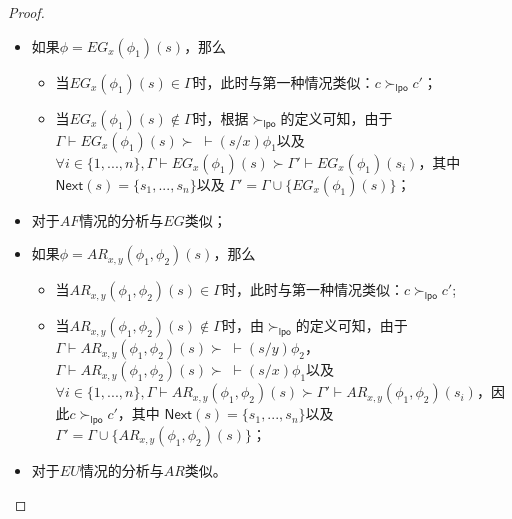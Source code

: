 \begin{proof}
\begin{itemize}
		\item 如果$\phi = EG_x(\phi_1)(s)$，那么
		\begin{itemize}
			\item 当$EG_x(\phi_1)(s)\in \Gamma$时，此时与第一种情况类似：$c\succ_{\mathsf{lpo}}c'$；
			\item 当$EG_x(\phi_1)(s)\not\in \Gamma$时，根据$\succ_{\mathsf{lpo}}$的定义可知，由于$\Gamma\vdash EG_x(\phi_1)(s) \succ \;\vdash(s/x)\phi_1$以及$\forall i\in\{1,...,n\}, \Gamma\vdash EG_x(\phi_1)(s) \succ \Gamma'\vdash EG_x(\phi_1)(s_i)$，其中$\textsf{Next}(s)=\{s_1,...,s_n\}$以及 $\Gamma'=\Gamma\cup\{EG_x(\phi_1)(s)\}$；
		\end{itemize}
		\item 对于$AF$情况的分析与$EG$类似；
		\item 如果$\phi = AR_{x,y}(\phi_1,\phi_2)(s)$，那么
		\begin{itemize}
			\item 当$AR_{x,y}(\phi_1,\phi_2)(s) \in \Gamma$时，此时与第一种情况类似：$c\succ_{\mathsf{lpo}}c'$;
			\item 当$AR_{x,y}(\phi_1,\phi_2)(s) \notin \Gamma$时，由$\succ_{\mathsf{lpo}}$的定义可知，由于$\Gamma\vdash AR_{x,y}(\phi_1,\phi_2)(s) \succ \;\vdash (s/y)\phi_2$， $\Gamma\vdash AR_{x,y}(\phi_1,\phi_2)(s) \succ \;\vdash (s/x)\phi_1$以及$\forall i\in\{1,...,n\}, \Gamma\vdash AR_{x,y}(\phi_1,\phi_2)(s) \succ \Gamma'\vdash AR_{x,y}(\phi_1,\phi_2)(s_i)$，因此$c\succ_{\mathsf{lpo}} c'$，其中 $\textsf{Next}(s)=\{s_1,...,s_n\}$以及 $\Gamma'=\Gamma\cup\{AR_{x,y}(\phi_1,\phi_2)(s)\}$；
		\end{itemize}
		\item 对于$EU$情况的分析与$AR$类似。
	\end{itemize}
\end{proof}


